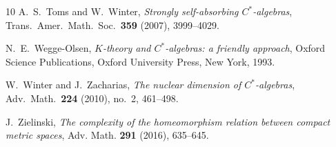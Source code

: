 \documentclass[12pt,fleqn,a4paper]{amsart}
\numberwithin{equation}{section}
\theoremstyle{definition}
\begin{document}
\begin{thebibliography}{10}
A.~S.~Toms and W.~Winter,
\emph{Strongly self-absorbing $C^*$-algebras},
Trans.\ Amer.\ Math.\ Soc.\ \textbf{359} (2007), 3999--4029.

N.~E.~Wegge-Olsen,
\emph{$K$-theory and $C^*$-algebras: a friendly approach},
Oxford Science Publications,
Oxford University Press, New York, 1993.

W.~Winter and J.~Zacharias,
\emph{The nuclear dimension of $C^*$-algebras},
Adv.\ Math.\ \textbf{224} (2010), no.~2, 461--498.

J.~Zielinski,
\emph{The complexity of the homeomorphism relation between compact metric spaces},
Adv. Math. \textbf{291} (2016), 635--645.


\end{thebibliography}
\end{document}
